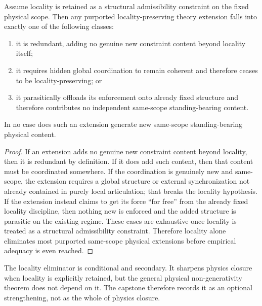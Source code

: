 \begin{theorem}
\label{thm:locality-eliminator}
Assume locality is retained as a structural admissibility constraint on the fixed physical scope. Then any purported locality-preserving theory extension falls into exactly one of the following classes:
\begin{enumerate}
  \item it is redundant, adding no genuine new constraint content beyond locality itself;
  \item it requires hidden global coordination to remain coherent and therefore ceases to be locality-preserving; or
  \item it parasitically offloads its enforcement onto already fixed structure and therefore contributes no independent same-scope standing-bearing content.
\end{enumerate}
In no case does such an extension generate new same-scope standing-bearing physical content.
\end{theorem}

\begin{proof}
If an extension adds no genuine new constraint content beyond locality, then it is redundant by definition. If it does add such content, then that content must be coordinated somewhere. If the coordination is genuinely new and same-scope, the extension requires a global structure or external synchronization not already contained in purely local articulation; that breaks the locality hypothesis. If the extension instead claims to get its force ``for free'' from the already fixed locality discipline, then nothing new is enforced and the added structure is parasitic on the existing regime. These cases are exhaustive once locality is treated as a structural admissibility constraint. Therefore locality alone eliminates most purported same-scope physical extensions before empirical adequacy is even reached.
\end{proof}

\begin{remark}
The locality eliminator is conditional and secondary. It sharpens physics closure when locality is explicitly retained, but the general physical non-generativity theorem does not depend on it. The capstone therefore records it as an optional strengthening, not as the whole of physics closure.
\end{remark}



